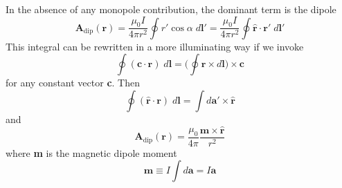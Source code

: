 \documentclass[../../../main.tex]{subfiles}
\begin{document}
In the absence of any monopole contribution, the dominant term is the dipole
\begin{equation*}
    \mathbf{A}_\text{dip}(\mathbf{r})=\frac{\mu_0I}{4\pi r^2}\oint r' \cos \alpha\;d\mathbf{l}'= \frac{\mu_0I}{4\pi r^2} \oint \mathbf{\hat{r}}\cdot\mathbf{r'}\;d\mathbf{l}'
\end{equation*}
This integral can be rewritten in a more illuminating way if we invoke
\begin{equation*}
    \oint  (\mathbf{c} \cdot \mathbf{r}) \;d\mathbf{l} =\biggl(\oint  \mathbf{r}\times d\mathbf{l }\biggr) \times \mathbf{c}
\end{equation*}
for any constant vector \textbf{c}. Then
\begin{equation*}
    \oint  (\mathbf{\hat{r}} \cdot \mathbf{r}) \;d\mathbf{l} = \int d\mathbf{a}'\times\mathbf{\hat{r}}
\end{equation*}
and 
\begin{equation*}
    \mathbf{A}_\text{dip}(\mathbf{r})=\frac{\mu_0 }{4\pi  }\frac{\mathbf{m}\times \mathbf{\hat{r}}}{r^2}
\end{equation*}
where \textbf{m} is the magnetic dipole moment
\begin{equation*}
    \mathbf{m}\equiv I\int d\mathbf{a}=I\mathbf{a}
\end{equation*}
\end{document}

